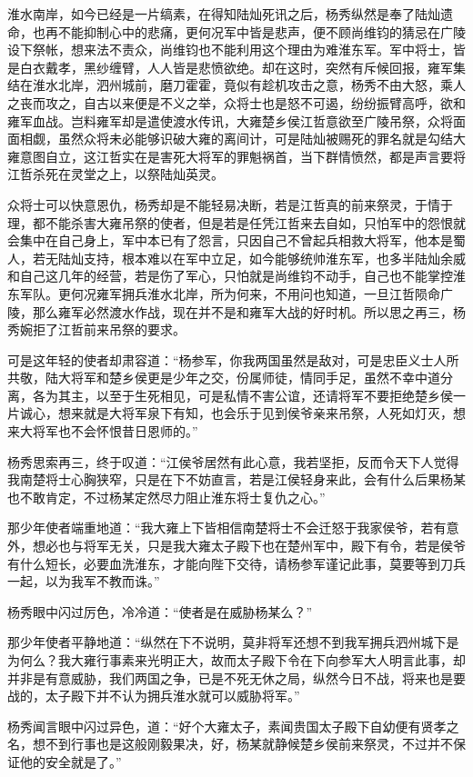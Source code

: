 淮水南岸，如今已经是一片缟素，在得知陆灿死讯之后，杨秀纵然是奉了陆灿遗命，也再不能抑制心中的悲痛，更何况军中皆是悲声，便不顾尚维钧的猜忌在广陵设下祭帐，想来法不责众，尚维钧也不能利用这个理由为难淮东军。军中将士，皆是白衣戴孝，黑纱缠臂，人人皆是悲愤欲绝。却在这时，突然有斥候回报，雍军集结在淮水北岸，泗州城前，磨刀霍霍，竟似有趁机攻击之意，杨秀不由大怒，乘人之丧而攻之，自古以来便是不义之举，众将士也是怒不可遏，纷纷振臂高呼，欲和雍军血战。岂料雍军却是遣使渡水传讯，大雍楚乡侯江哲意欲至广陵吊祭，众将面面相觑，虽然众将未必能够识破大雍的离间计，可是陆灿被赐死的罪名就是勾结大雍意图自立，这江哲实在是害死大将军的罪魁祸首，当下群情愤然，都是声言要将江哲杀死在灵堂之上，以祭陆灿英灵。

众将士可以快意恩仇，杨秀却是不能轻易决断，若是江哲真的前来祭灵，于情于理，都不能杀害大雍吊祭的使者，但是若是任凭江哲来去自如，只怕军中的怨恨就会集中在自己身上，军中本已有了怨言，只因自己不曾起兵相救大将军，他本是蜀人，若无陆灿支持，根本难以在军中立足，如今能够统帅淮东军，也多半陆灿余威和自己这几年的经营，若是伤了军心，只怕就是尚维钧不动手，自己也不能掌控淮东军队。更何况雍军拥兵淮水北岸，所为何来，不用问也知道，一旦江哲陨命广陵，那么雍军必然渡水作战，现在并不是和雍军大战的好时机。所以思之再三，杨秀婉拒了江哲前来吊祭的要求。

可是这年轻的使者却肃容道：“杨参军，你我两国虽然是敌对，可是忠臣义士人所共敬，陆大将军和楚乡侯更是少年之交，份属师徒，情同手足，虽然不幸中道分离，各为其主，以至于生死相见，可是私情不害公谊，还请将军不要拒绝楚乡侯一片诚心，想来就是大将军泉下有知，也会乐于见到侯爷亲来吊祭，人死如灯灭，想来大将军也不会怀恨昔日恩师的。”

杨秀思索再三，终于叹道：“江侯爷居然有此心意，我若坚拒，反而令天下人觉得我南楚将士心胸狭窄，只是在下不妨直言，若是江侯轻身来此，会有什么后果杨某也不敢肯定，不过杨某定然尽力阻止淮东将士复仇之心。”

那少年使者端重地道：“我大雍上下皆相信南楚将士不会迁怒于我家侯爷，若有意外，想必也与将军无关，只是我大雍太子殿下也在楚州军中，殿下有令，若是侯爷有什么短长，必要血洗淮东，才能向陛下交待，请杨参军谨记此事，莫要等到刀兵一起，以为我军不教而诛。”

杨秀眼中闪过厉色，冷冷道：“使者是在威胁杨某么？”

那少年使者平静地道：“纵然在下不说明，莫非将军还想不到我军拥兵泗州城下是为何么？我大雍行事素来光明正大，故而太子殿下令在下向参军大人明言此事，却并非是有意威胁，我们两国之争，已是不死无休之局，纵然今日不战，将来也是要战的，太子殿下并不认为拥兵淮水就可以威胁将军。”

杨秀闻言眼中闪过异色，道：“好个大雍太子，素闻贵国太子殿下自幼便有贤孝之名，想不到行事也是这般刚毅果决，好，杨某就静候楚乡侯前来祭灵，不过并不保证他的安全就是了。”

